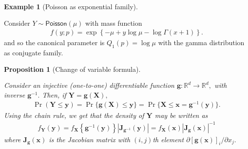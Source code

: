 \documentclass[
  11pt,
  letterpaper,
]{scrbook}
\theoremstyle{definition}
\newtheorem{example}{Example}[chapter]
\theoremstyle{plain}
\newtheorem{proposition}{Proposition}[chapter]
\theoremstyle{plain}
\theoremstyle{plain}
\theoremstyle{definition}
\theoremstyle{definition}
\theoremstyle{plain}
\newtheorem{proposition}{Proposition}[chapter]
\theoremstyle{plain}
\theoremstyle{remark}
\begin{document}
\begin{example}[Poisson as exponential
family]\protect\hypertarget{exm-exponential-family-poisson}{}\label{exm-exponential-family-poisson}

Consider \(Y \sim \mathsf{Poisson}(\mu)\) with mass function
\begin{align*}
f(y; p)=\exp \left\{ - \mu + y \log \mu - \log \Gamma(x+1)\right\}.
\end{align*} and so the canonical parameter is \(Q_1(p) = \log \mu\)
with the gamma distribution as conjugate family.

\end{example}

\begin{proposition}[Change of variable
formula]\protect\hypertarget{prp-change-variable}{}\label{prp-change-variable}

Consider an injective (one-to-one) differentiable function
\(\boldsymbol{g}: \mathbb{R}^d \to \mathbb{R}^d,\) with inverse
\(\boldsymbol{g}^{-1}.\) Then, if
\(\boldsymbol{Y}=\boldsymbol{g}(\boldsymbol{X}),\) \begin{align*}
\Pr(\boldsymbol{Y} \leq \boldsymbol{y}) = \Pr\{\boldsymbol{g}(\boldsymbol{X}) \leq \boldsymbol{y}\} = \Pr\{\boldsymbol{X} \leq \boldsymbol{x} = \boldsymbol{g}^{-1}(\boldsymbol{y})\}.
\end{align*} Using the chain rule, we get that the density of
\(\boldsymbol{Y}\) may be written as \begin{align*}
f_{\boldsymbol{Y}}(\boldsymbol{y}) = f_{\boldsymbol{X}}\left\{\boldsymbol{g}^{-1}(\boldsymbol{y})\right\} \left| \mathbf{J}_{\boldsymbol{g}^{-1}}(\boldsymbol{y})\right| = f_{\boldsymbol{X}}(\boldsymbol{x}) \left| \mathbf{J}_{\boldsymbol{g}}(\boldsymbol{x})\right|^{-1}
\end{align*} where \(\mathbf{J}_{\boldsymbol{g}}(\boldsymbol{x})\) is
the Jacobian matrix with \((i,j)\)th element
\(\partial [\boldsymbol{g}(\boldsymbol{x})]_i / \partial x_j.\)

\end{proposition}
\end{document}
